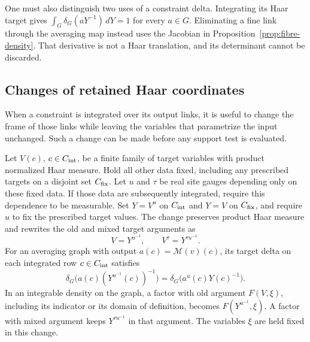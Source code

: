 \documentclass[11pt,letterpaper,reqno]{amsart}
\makeatletter
\numberwithin{equation}{section}
\theoremstyle{definition}
\newcommand{\ms@minorstart}{%
  \pushQED{\qed}\renewcommand{\qedsymbol}{$\blacksquare$}}
\newenvironment{proposition}[1][]{\ms@minorstart\ms@proposition[#1]}
  {\popQED\endms@proposition}
\theoremstyle{remark}
\makeatother
\begin{document}
One must also distinguish two uses of a constraint delta. Integrating
its Haar target gives
$\int_G\delta_G(aY^{-1})\,dY=1$ for every $a\in G$.
Eliminating a fine link through the averaging map instead uses the
Jacobian in Proposition~\ref{prop:fibre-density}. That derivative
is not a Haar translation, and its determinant cannot be discarded.

\subsection{Changes of retained Haar coordinates}
\label{sec:guarded-haar}

When a constraint is integrated over its output links, it is useful
to change the frame of those links while leaving the variables that
parametrize the input unchanged. Such a change can be made before
any support test is evaluated.

\begin{proposition}[Change of target frame]\label{prop:guarded-haar}
Let \(V(c)\), \(c\in C_{\rm int}\), be a finite family of target
variables with product normalized Haar measure. Hold all other data
fixed, including any prescribed targets on a disjoint set
\(C_{\rm fix}\). Let \(u\) and \(\tau\) be real site gauges
depending only on these fixed data. If those data are subsequently
integrated, require this dependence to be measurable. Set \(Y=V^u\) on
\(C_{\rm int}\) and \(Y=V\) on \(C_{\rm fix}\), and require
\(u\) to fix the prescribed target values. The change preserves
product Haar measure and rewrites
the old and mixed target arguments as
\[
 V=Y^{u^{-1}},\qquad V^\tau=Y^{\tau u^{-1}}.
\]
For an averaging graph with output \(a(c)=\mathcal M(v)(c)\),
its target delta on each integrated row \(c\in C_{\rm int}\) satisfies
\begin{equation}\label{eq:guarded-haar-delta}
 \delta_G\bigl(a(c)(Y^{u^{-1}}(c))^{-1}\bigr)
          =\delta_G\bigl(a^u(c)Y(c)^{-1}\bigr).
\end{equation}
In an integrable density on the graph, a factor with old argument
\(F(V,\xi)\), including its indicator or its domain of definition,
becomes \(F(Y^{u^{-1}},\xi)\). A factor with mixed argument keeps
\(Y^{\tau u^{-1}}\) in that argument. The variables \(\xi\) are held
fixed in this change.
\end{proposition}
\end{document}
